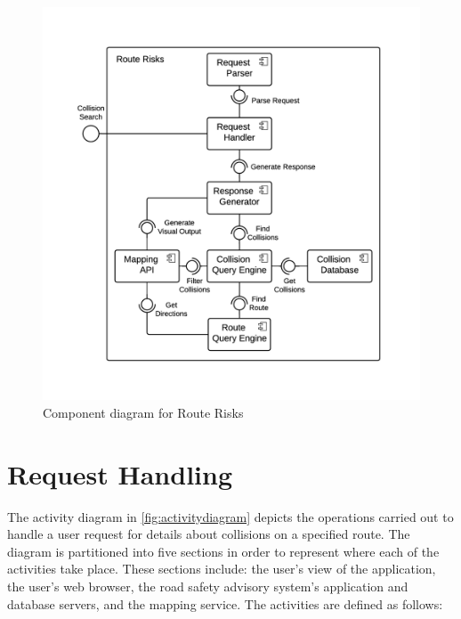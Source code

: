 \documentclass[authoryearcitations]{UoYCSproject}
\begin{document}
\begin{figure}
	\center
	\includegraphics[scale=1]{componentdiagram}
	\caption{Component diagram for Route Risks}
	\label{fig:componentdiagram}
\end{figure}

\section{Request Handling}

The activity diagram in \autoref{fig:activitydiagram} depicts the operations carried out to handle a user request for details about collisions on a specified route. The diagram is partitioned into five sections in order to represent where each of the activities take place. These sections include: the user's view of the application, the user's web browser, the road safety advisory system's application and database servers, and the mapping service. The activities are defined as follows:
\end{document}
